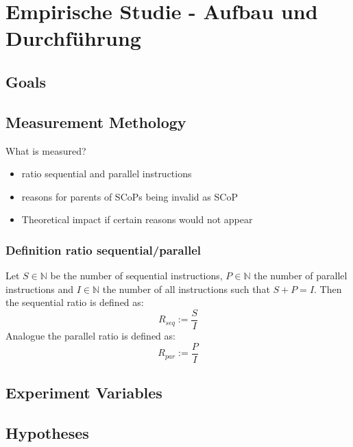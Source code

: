 \chapter{Empirische Studie - Aufbau und Durchführung}
\section{Goals}

\section{Measurement Methology}
What is measured?
\begin{itemize}
    \item ratio sequential and parallel instructions
    \item reasons for parents of SCoPs being invalid as SCoP
    \item Theoretical impact if certain reasons would not appear
\end{itemize}
\subsection{Definition ratio sequential/parallel}
Let \(S\in\mathbb{N}\) be the number of sequential instructions, \(P\in\mathbb{N}\) the number of parallel instructions and \(I\in\mathbb{N}\) the number of all instructions such that \(S + P = I\).
Then the sequential ratio is defined as:
\[R_{seq} := \frac{S}{I}\]
Analogue the parallel ratio is defined as:
\[R_{par} := \frac{P}{I}\]

\section{Experiment Variables}

\section{Hypotheses}

